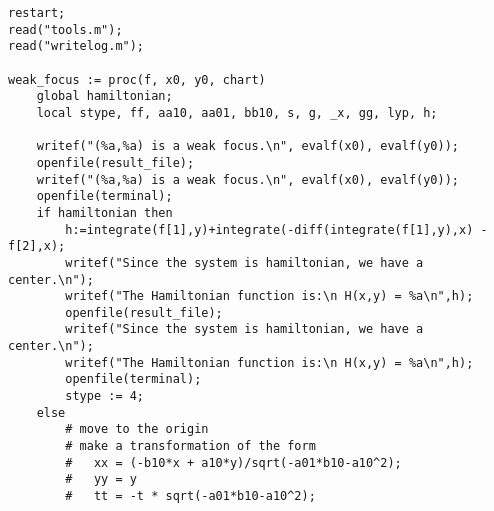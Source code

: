\documentclass[a4paper,10pt]{article}
\begin{document}
\begin{lstlisting}[name=weakfocus]
restart;
read("tools.m");
read("writelog.m");

weak_focus := proc(f, x0, y0, chart)
    global hamiltonian;
    local stype, ff, aa10, aa01, bb10, s, g, _x, gg, lyp, h;

    writef("(%a,%a) is a weak focus.\n", evalf(x0), evalf(y0));
    openfile(result_file);
    writef("(%a,%a) is a weak focus.\n", evalf(x0), evalf(y0));
    openfile(terminal);
    if hamiltonian then
        h:=integrate(f[1],y)+integrate(-diff(integrate(f[1],y),x) - f[2],x);
        writef("Since the system is hamiltonian, we have a center.\n");
        writef("The Hamiltonian function is:\n H(x,y) = %a\n",h);
        openfile(result_file);
        writef("Since the system is hamiltonian, we have a center.\n");
        writef("The Hamiltonian function is:\n H(x,y) = %a\n",h);
        openfile(terminal);
        stype := 4;
    else
        # move to the origin
        # make a transformation of the form
        #   xx = (-b10*x + a10*y)/sqrt(-a01*b10-a10^2);
        #   yy = y
        #   tt = -t * sqrt(-a01*b10-a10^2);


\end{lstlisting}
\end{document}
